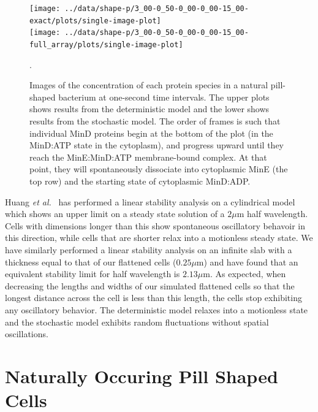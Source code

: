 \documentclass{pnastwo}
\newcommand\micron{\ensuremath{\mu\text{m}}}
\begin{document}
\begin{article}
\begin{figure}
  \begin{center}
    \texttt{[image: ../data/shape-p/3\_00-0\_50-0\_00-0\_00-15\_00-exact/plots/single-image-plot]}\\
    \vspace{-1.5em}
    \texttt{[image: ../data/shape-p/3\_00-0\_50-0\_00-0\_00-15\_00-full\_array/plots/single-image-plot]}
    \vspace{-1.5em}
  \end{center}
  \caption{Images of the concentration of each protein species in a
    natural pill-shaped bacterium at one-second time intervals. The
    upper plots shows results from the deterministic model and the
    lower shows results from the stochastic model.  The order of
    frames is such that individual MinD proteins begin at the bottom
    of the plot (in the MinD:ATP state in the cytoplasm), and progress
    upward until they reach the MinE:MinD:ATP membrane-bound complex.
    At that point, they will spontaneously dissociate into cytoplasmic
    MinE (the top row) and the starting state of cytoplasmic
    MinD:ADP.}.
  \label{image-p}
\end{figure}

Huang \emph{et al.}~\cite{huang2003dynamic} has performed a linear
stability analysis on a cylindrical model which shows an upper limit
on a steady state solution of a $2\micron$ half wavelength.  Cells
with dimensions longer than this show spontaneous oscillatory behavoir
in this direction, while cells that are shorter relax into a
motionless steady state.  We have similarly performed a linear
stability analysis on an infinite slab with a thickness equal to that
of our flattened cells ($0.25\micron$) and have found that an
equivalent stability limit for half wavelength is $2.13\micron$. As
expected, when decreasing the lengths and widths of our simulated
flattened cells so that the longest distance across the cell is less
than this length, the cells stop exhibiting any oscillatory behavior.
The deterministic model relaxes into a motionless state and the
stochastic model exhibits random fluctuations without spatial
oscillations.

\section{Naturally Occuring Pill Shaped Cells}


\end{article}
\end{document}
